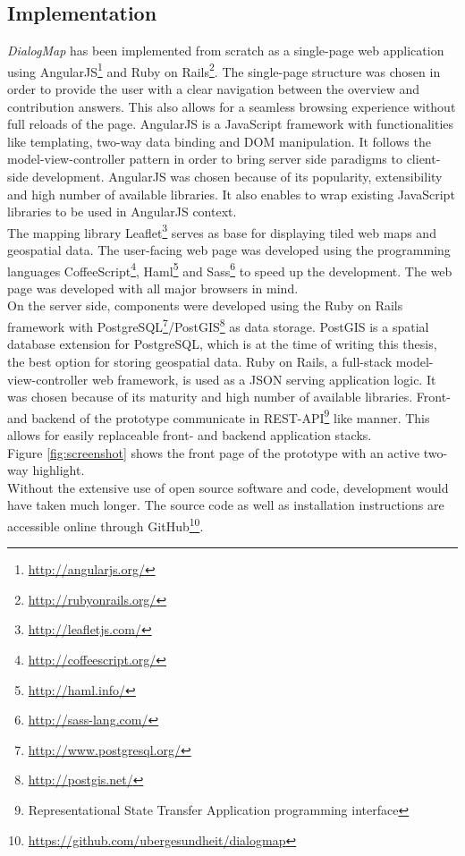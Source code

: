 \subsection{Implementation}
\label{sub:implementation}
\textit{DialogMap} has been implemented from scratch as a single-page web application using AngularJS\footnote{\url{http://angularjs.org/}} and Ruby on Rails\footnote{\url{http://rubyonrails.org/}}. The single-page structure was chosen in order to provide the user with a clear navigation between the overview and contribution answers. This also allows for a seamless browsing experience without full reloads of the page. AngularJS is a JavaScript framework with functionalities like templating, two-way data binding and DOM manipulation. It follows the model-view-controller pattern in order to bring server side paradigms to client-side development. AngularJS was chosen because of its popularity, extensibility and high number of available libraries. It also enables to wrap existing JavaScript libraries to be used in AngularJS context.\\
The mapping library Leaflet\footnote{\url{http://leafletjs.com/}} serves as base for displaying tiled web maps and geospatial data. The user-facing web page was developed using the programming languages CoffeeScript\footnote{\url{http://coffeescript.org/}}, Haml\footnote{\url{http://haml.info/}} and Sass\footnote{\url{http://sass-lang.com/}} to speed up the development. The web page was developed with all major browsers in mind.\\
On the server side, components were developed using the Ruby on Rails framework with PostgreSQL\footnote{\url{http://www.postgresql.org/}}/PostGIS\footnote{\url{http://postgis.net/}} as data storage. PostGIS is a spatial database extension for PostgreSQL, which is at the time of writing this thesis, the best option for storing geospatial data. Ruby on Rails, a full-stack model-view-controller web framework, is used as a JSON serving application logic. It was chosen because of its maturity and high number of available libraries. Front- and backend of the prototype communicate in REST-API\footnote{Representational State Transfer Application programming interface} like manner. This allows for easily replaceable front- and backend application stacks.\\
Figure \ref{fig:screenshot} shows the front page of the prototype with an active two-way highlight.\\
Without the extensive use of open source software and code, development would have taken much longer. The source code as well as installation instructions are accessible online through GitHub\footnote{\url{https://github.com/ubergesundheit/dialogmap}}.




